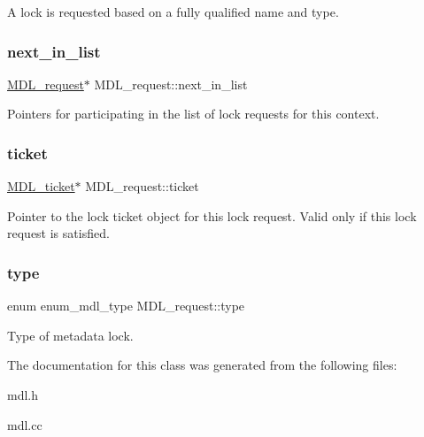A lock is requested based on a fully qualified name and type. \mbox{\label{classMDL__request_ad9d3b3f440b67b7665b3a2701a14e2b2}} 
\subsubsection{\texorpdfstring{next\+\_\+in\+\_\+list}{next\_in\_list}}
{\footnotesize\ttfamily \mbox{\hyperlink{classMDL__request}{M\+D\+L\+\_\+request}}$\ast$ M\+D\+L\+\_\+request\+::next\+\_\+in\+\_\+list}

Pointers for participating in the list of lock requests for this context. \mbox{\label{classMDL__request_a99421002fe2ea1580766846c0ef339ae}} 
\subsubsection{\texorpdfstring{ticket}{ticket}}
{\footnotesize\ttfamily \mbox{\hyperlink{classMDL__ticket}{M\+D\+L\+\_\+ticket}}$\ast$ M\+D\+L\+\_\+request\+::ticket}

Pointer to the lock ticket object for this lock request. Valid only if this lock request is satisfied. \mbox{\label{classMDL__request_a13f9ecefea91a5355e694339ed9f7943}} 
\subsubsection{\texorpdfstring{type}{type}}
{\footnotesize\ttfamily enum enum\+\_\+mdl\+\_\+type M\+D\+L\+\_\+request\+::type}

Type of metadata lock. 

The documentation for this class was generated from the following files\+:\begin{DoxyCompactItemize}
\item 
mdl.\+h\item 
mdl.\+cc\end{DoxyCompactItemize}

